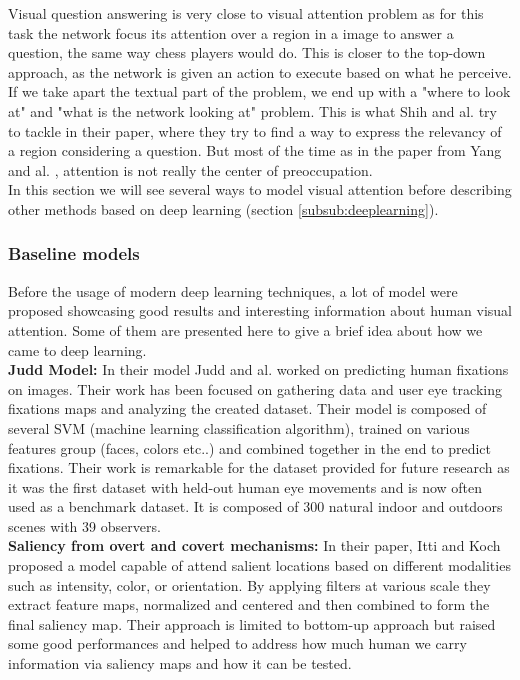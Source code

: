Visual question answering is very close to visual attention problem as for this task the network focus its attention over a region in a image to answer a question, the same way chess players would do. This is closer to the top-down approach, as the network is given an action to execute based on what he perceive. If we take apart the textual part of the problem, we end up with a "where to look at" and "what is the network looking at" problem. This is what Shih and al. \cite{DBLP:journals/corr/ShihSH15} try to tackle in their paper, where they try to find a way to express the relevancy of a region considering a question.
But most of the time as in the paper from Yang and al. \cite{DBLP:journals/corr/YangHGDS15}, attention is not really the center of preoccupation.\\

In this section we will see several ways to model visual attention before describing other methods based on deep learning (section \ref{subsub:deeplearning}).
\subsubsection{Baseline models}

Before the usage of modern deep learning techniques, a lot of model were proposed showcasing good results and interesting information about human visual attention. Some of them are presented here to give a brief idea about how we came to deep learning.\\


\textbf{Judd Model:  }In their model Judd and al. \cite{judd} worked on predicting human fixations on images. Their work has been focused on gathering data and user eye tracking fixations maps and analyzing the created dataset. Their model is composed of several SVM \cite{Cortes1995} (machine learning classification algorithm), trained on various features group (faces, colors etc..) and combined together in the end to predict fixations. Their work is remarkable for the dataset provided for future research as it was the first dataset with held-out human eye movements and is now often used as a benchmark dataset. It is composed of 300 natural indoor and outdoors scenes with 39 observers.\\


\textbf{Saliency from overt and covert mechanisms:  }In their paper, Itti and Koch \cite{ITTI20001489} proposed a model capable of attend salient locations based on different modalities such as intensity, color, or orientation. By applying filters at various scale they extract feature maps, normalized and centered and then combined to form the final saliency map. Their approach is limited to bottom-up approach but raised some good performances and helped to address how much human we carry information via saliency maps and how it can be tested.\\

